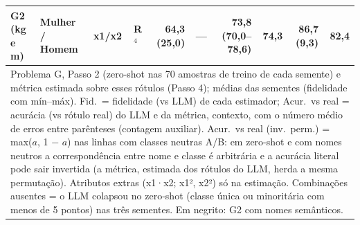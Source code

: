\begin{table}[htbp]
\begin{tabular}{llllrrrrrr}
G2 (kg e m) & Mulher / Homem & x1/x2 & R$^4$ & 64,3 (25,0) & — & 73,8 (70,0–78,6) & 74,3 & 86,7 (9,3) & 82,4 \\
\bottomrule
\multicolumn{10}{p{0.95\linewidth}}{\footnotesize Problema G, Passo 2 (zero-shot nas 70 amostras de treino de cada semente) e métrica estimada sobre esses rótulos (Passo 4); médias das sementes (fidelidade com mín–máx). Fid.\ = fidelidade (vs LLM) de cada estimador; Acur.\ vs real = acurácia (vs rótulo real) do LLM e da métrica, contexto, com o número médio de erros entre parênteses (contagem auxiliar). Acur.\ vs real (inv.\ perm.) = max($a$, 1 $-$ $a$) nas linhas com classes neutras A/B: em zero-shot e com nomes neutros a correspondência entre nome e classe é arbitrária e a acurácia literal pode sair invertida (a métrica, estimada dos rótulos do LLM, herda a mesma permutação). Atributos extras (x1·x2; x1², x2²) só na estimação. Combinações ausentes = o LLM colapsou no zero-shot (classe única ou minoritária com menos de 5 pontos) nas três sementes. Em negrito: G2 com nomes semânticos.} \\
\end{tabular}
\end{table}
